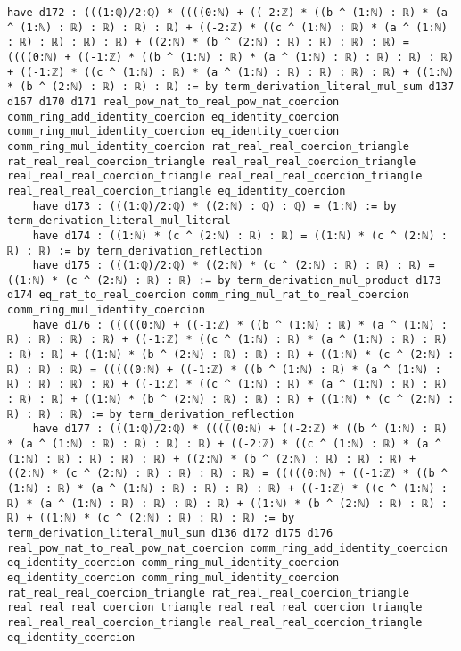 \documentclass{article}
\begin{document}
\begin{tcolorbox}[colback=white!10, width=\linewidth]
\begin{lstlisting}[language=Lean4]
    have d172 : (((1:ℚ)/2:ℚ) * ((((0:ℕ) + ((-2:ℤ) * ((b ^ (1:ℕ) : ℝ) * (a ^ (1:ℕ) : ℝ) : ℝ) : ℝ) : ℝ) + ((-2:ℤ) * ((c ^ (1:ℕ) : ℝ) * (a ^ (1:ℕ) : ℝ) : ℝ) : ℝ) : ℝ) + ((2:ℕ) * (b ^ (2:ℕ) : ℝ) : ℝ) : ℝ) : ℝ) = ((((0:ℕ) + ((-1:ℤ) * ((b ^ (1:ℕ) : ℝ) * (a ^ (1:ℕ) : ℝ) : ℝ) : ℝ) : ℝ) + ((-1:ℤ) * ((c ^ (1:ℕ) : ℝ) * (a ^ (1:ℕ) : ℝ) : ℝ) : ℝ) : ℝ) + ((1:ℕ) * (b ^ (2:ℕ) : ℝ) : ℝ) : ℝ) := by term_derivation_literal_mul_sum d137 d167 d170 d171 real_pow_nat_to_real_pow_nat_coercion comm_ring_add_identity_coercion eq_identity_coercion comm_ring_mul_identity_coercion eq_identity_coercion comm_ring_mul_identity_coercion rat_real_real_coercion_triangle rat_real_real_coercion_triangle real_real_real_coercion_triangle real_real_real_coercion_triangle real_real_real_coercion_triangle real_real_real_coercion_triangle eq_identity_coercion
    have d173 : (((1:ℚ)/2:ℚ) * ((2:ℕ) : ℚ) : ℚ) = (1:ℕ) := by term_derivation_literal_mul_literal
    have d174 : ((1:ℕ) * (c ^ (2:ℕ) : ℝ) : ℝ) = ((1:ℕ) * (c ^ (2:ℕ) : ℝ) : ℝ) := by term_derivation_reflection
    have d175 : (((1:ℚ)/2:ℚ) * ((2:ℕ) * (c ^ (2:ℕ) : ℝ) : ℝ) : ℝ) = ((1:ℕ) * (c ^ (2:ℕ) : ℝ) : ℝ) := by term_derivation_mul_product d173 d174 eq_rat_to_real_coercion comm_ring_mul_rat_to_real_coercion comm_ring_mul_identity_coercion
    have d176 : (((((0:ℕ) + ((-1:ℤ) * ((b ^ (1:ℕ) : ℝ) * (a ^ (1:ℕ) : ℝ) : ℝ) : ℝ) : ℝ) + ((-1:ℤ) * ((c ^ (1:ℕ) : ℝ) * (a ^ (1:ℕ) : ℝ) : ℝ) : ℝ) : ℝ) + ((1:ℕ) * (b ^ (2:ℕ) : ℝ) : ℝ) : ℝ) + ((1:ℕ) * (c ^ (2:ℕ) : ℝ) : ℝ) : ℝ) = (((((0:ℕ) + ((-1:ℤ) * ((b ^ (1:ℕ) : ℝ) * (a ^ (1:ℕ) : ℝ) : ℝ) : ℝ) : ℝ) + ((-1:ℤ) * ((c ^ (1:ℕ) : ℝ) * (a ^ (1:ℕ) : ℝ) : ℝ) : ℝ) : ℝ) + ((1:ℕ) * (b ^ (2:ℕ) : ℝ) : ℝ) : ℝ) + ((1:ℕ) * (c ^ (2:ℕ) : ℝ) : ℝ) : ℝ) := by term_derivation_reflection
    have d177 : (((1:ℚ)/2:ℚ) * (((((0:ℕ) + ((-2:ℤ) * ((b ^ (1:ℕ) : ℝ) * (a ^ (1:ℕ) : ℝ) : ℝ) : ℝ) : ℝ) + ((-2:ℤ) * ((c ^ (1:ℕ) : ℝ) * (a ^ (1:ℕ) : ℝ) : ℝ) : ℝ) : ℝ) + ((2:ℕ) * (b ^ (2:ℕ) : ℝ) : ℝ) : ℝ) + ((2:ℕ) * (c ^ (2:ℕ) : ℝ) : ℝ) : ℝ) : ℝ) = (((((0:ℕ) + ((-1:ℤ) * ((b ^ (1:ℕ) : ℝ) * (a ^ (1:ℕ) : ℝ) : ℝ) : ℝ) : ℝ) + ((-1:ℤ) * ((c ^ (1:ℕ) : ℝ) * (a ^ (1:ℕ) : ℝ) : ℝ) : ℝ) : ℝ) + ((1:ℕ) * (b ^ (2:ℕ) : ℝ) : ℝ) : ℝ) + ((1:ℕ) * (c ^ (2:ℕ) : ℝ) : ℝ) : ℝ) := by term_derivation_literal_mul_sum d136 d172 d175 d176 real_pow_nat_to_real_pow_nat_coercion comm_ring_add_identity_coercion eq_identity_coercion comm_ring_mul_identity_coercion eq_identity_coercion comm_ring_mul_identity_coercion rat_real_real_coercion_triangle rat_real_real_coercion_triangle real_real_real_coercion_triangle real_real_real_coercion_triangle real_real_real_coercion_triangle real_real_real_coercion_triangle eq_identity_coercion

\end{lstlisting}
\end{tcolorbox}
\end{document}
